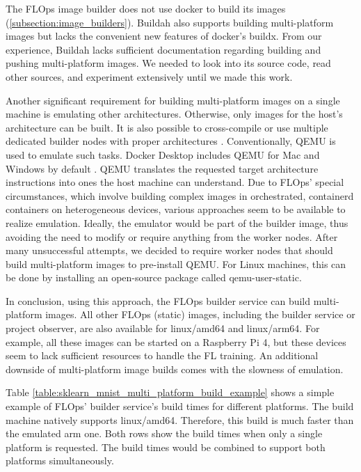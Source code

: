 The FLOps image builder does not use docker to build its images (\ref{subsection:image_builders}).
Buildah also supports building multi-platform images but lacks the convenient new features of docker's buildx.
From our experience, Buildah lacks sufficient documentation regarding building and pushing multi-platform images.
We needed to look into its source code, read other sources, and experiment extensively until we made this work.

Another significant requirement for building multi-platform images on a single machine is emulating other architectures.
Otherwise, only images for the host's architecture can be built.
It is also possible to cross-compile or use multiple dedicated builder nodes with proper architectures \cite{docs:docker_multiplatform_image_builds}.
Conventionally, QEMU \cite{docs:quemu} is used to emulate such tasks.
Docker Desktop includes QEMU for Mac and Windows by default \cite{docs:docker_multiplatform_image_builds}.
QEMU translates the requested target architecture instructions into ones the host machine can understand.
Due to FLOps' special circumstances, which involve building complex images in orchestrated, containerd containers on heterogeneous devices, various approaches seem to be available to realize emulation.
Ideally, the emulator would be part of the builder image, thus avoiding the need to modify or require anything from the worker nodes.
After many unsuccessful attempts, we decided to require worker nodes that should build multi-platform images to pre-install QEMU.
For Linux machines, this can be done by installing an open-source package called qemu-user-static.

In conclusion, using this approach, the FLOps builder service can build multi-platform images.
All other FLOps (static) images, including the builder service or project observer, are also available for linux/amd64 and linux/arm64.
For example, all these images can be started on a Raspberry Pi 4, but these devices seem to lack sufficient resources to handle the FL training.
An additional downside of multi-platform image builds comes with the slowness of emulation.

Table \ref{table:sklearn_mnist_multi_platform_build_example} shows a simple example of FLOps' builder service's build times for different platforms.
The build machine natively supports linux/amd64.
Therefore, this build is much faster than the emulated arm one.
Both rows show the build times when only a single platform is requested.
The build times would be combined to support both platforms simultaneously.

